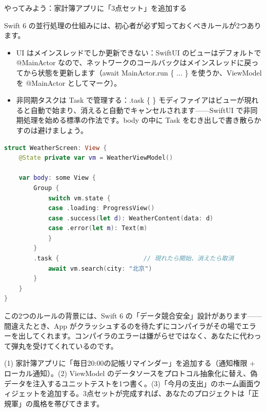 \begin{tcbpractice}{やってみよう：家計簿アプリに「3点セット」を追加する}

Swift 6 の並行処理の仕組みには、初心者が必ず知っておくべきルールが2つあります。

\begin{itemize}
  \item UI はメインスレッドでしか更新できない：SwiftUI のビューはデフォルトで @MainActor なので、ネットワークのコールバックはメインスレッドに戻ってから状態を更新します（await MainActor.run \{ ... \} を使うか、ViewModel を @MainActor としてマーク）。
  \item 非同期タスクは Task で管理する：.task \{ \} モディファイアはビューが現れると自動で始まり、消えると自動でキャンセルされます——SwiftUI で非同期処理を始める標準の作法です。body の中に Task をむき出しで書き散らかすのは避けましょう。
\end{itemize}

\begin{lstlisting}[language=Swift]
struct WeatherScreen: View {
    @State private var vm = WeatherViewModel()

    var body: some View {
        Group {
            switch vm.state {
            case .loading: ProgressView()
            case .success(let d): WeatherContent(data: d)
            case .error(let m): Text(m)
            }
        }
        .task {                       // 現れたら開始、消えたら取消
            await vm.search(city: "北京")
        }
    }
}
\end{lstlisting}

この2つのルールの背景には、Swift 6 の「データ競合安全」設計があります——間違えたとき、App がクラッシュするのを待たずにコンパイラがその場でエラーを出してくれます。コンパイラのエラーは嫌がらせではなく、あなたに代わって弾丸を受けてくれているのです。

(1) 家計簿アプリに「毎日20:00の記帳リマインダー」を追加する（通知権限 + ローカル通知）。(2) ViewModel のデータソースをプロトコル抽象化に替え、偽データを注入するユニットテストを1つ書く。(3)「今月の支出」のホーム画面ウィジェットを追加する。3点セットが完成すれば、あなたのプロジェクトは「正規軍」の風格を帯びてきます。

\end{tcbpractice}

